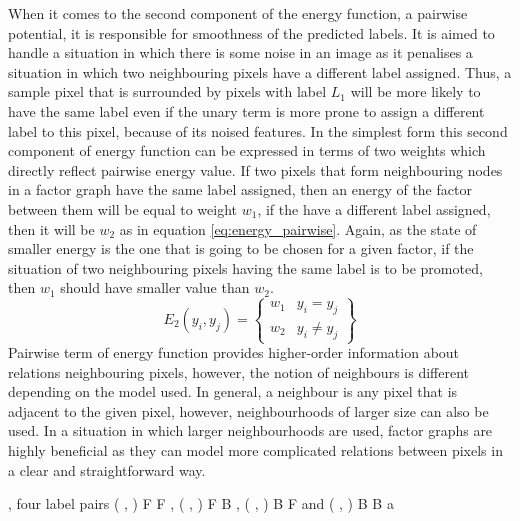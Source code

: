 When it comes to the second component of the energy function, a pairwise potential, it is responsible for smoothness of the predicted labels. It is aimed to handle a situation in which there is some noise in an image as it penalises a situation in which two neighbouring pixels have a different label assigned. Thus, a sample pixel that is surrounded by pixels with label $L_1$ will be more likely to have the same label even if the unary term is more prone to assign a different label to this pixel, because of its noised features. In the simplest form this second component of energy function can be expressed in terms of two weights which directly reflect pairwise energy value. If two pixels that form neighbouring nodes in a factor graph have the same label assigned, then an energy of the factor between them will be equal to weight $w_1$, if the have a different label assigned, then it will be $w_2$ as in equation \ref{eq:energy_pairwise}. Again, as the state of smaller energy is the one that is going to be chosen for a given factor, if the situation of two neighbouring pixels having the same label is to be promoted, then $w_1$ should have smaller value than $w_2$.
\begin{equation}
 \label{eq:energy_pairwise}
    E_2(y_i,y_j)=\begin{Bmatrix}
     w_1 & y_i=y_j \\ 
     w_2 & y_i \neq y_j
    \end{Bmatrix}
\end{equation}
Pairwise term of energy function provides higher-order information about relations neighbouring pixels, however, the notion of neighbours is different depending on the model used. In general, a neighbour is any pixel that is adjacent to the given pixel, however, neighbourhoods of larger size can also be used. In a situation in which larger neighbourhoods are used, factor graphs are highly beneficial as they can model more complicated relations between pixels in a clear and straightforward way.


 




, four label pairs
( , ) F F , ( , ) F B , ( , ) B F
 and
( , ) B B
 a